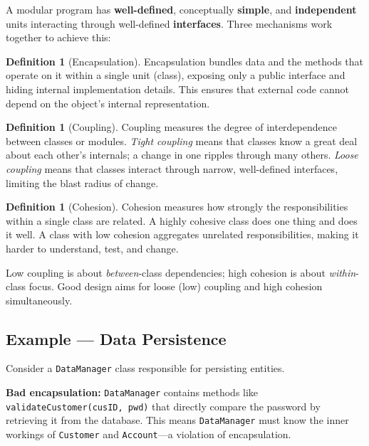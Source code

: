 \documentclass[11pt, a4paper, notitlepage]{report}
\theoremstyle{definition}
\newtheorem{definition}[theorem]{Definition}
\theoremstyle{remark}
\theoremstyle{definition}
\begin{document}
A modular program has \textbf{well-defined}, conceptually \textbf{simple}, and
\textbf{independent} units interacting through well-defined \textbf{interfaces}. Three
mechanisms work together to achieve this:

\begin{definition}[Encapsulation]
\label{def:ch9-encapsulation}
Encapsulation bundles data and the methods that operate on it within a single unit
(class), exposing only a public interface and hiding internal implementation details.
This ensures that external code cannot depend on the object's internal representation.
\end{definition}

\begin{definition}[Coupling]
\label{def:ch9-coupling}
Coupling measures the degree of interdependence between classes or modules. \emph{Tight
coupling} means that classes know a great deal about each other's internals; a change in
one ripples through many others. \emph{Loose coupling} means that classes interact through
narrow, well-defined interfaces, limiting the blast radius of change.
\end{definition}

\begin{definition}[Cohesion]
\label{def:ch9-cohesion}
Cohesion measures how strongly the responsibilities within a single class are related.
A highly cohesive class does one thing and does it well. A class with low cohesion
aggregates unrelated responsibilities, making it harder to understand, test, and change.
\end{definition}

\begin{examtip}[title={Exam Tip: Coupling vs.\ Cohesion}]
  Low coupling is about \emph{between}-class dependencies; high cohesion is about
  \emph{within}-class focus. Good design aims for loose (low) coupling and high cohesion
  simultaneously.
\end{examtip}

\subsection{Example --- Data Persistence}
\label{subsec:ch9-data-persistence}

Consider a \texttt{DataManager} class responsible for persisting entities.

\textbf{Bad encapsulation:} \texttt{DataManager} contains methods like
\texttt{validateCustomer(cusID, pwd)} that directly compare the password by retrieving
it from the database. This means \texttt{DataManager} must know the inner workings of
\texttt{Customer} and \texttt{Account}---a violation of encapsulation.
\end{document}
